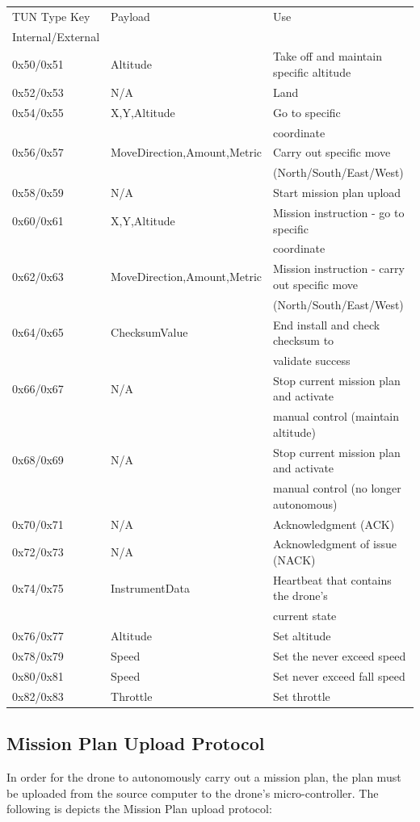 \documentclass[12pt,a4paper]{article}
\begin{document}
	\begin{tabular}{l | l | l}
	TUN Type Key & Payload & Use \\
	Internal/External &  & \\
	\hline
	0x50/0x51 & Altitude & Take off and maintain specific altitude \\
	0x52/0x53 & N/A & Land \\ 
	0x54/0x55 & X,Y,Altitude & Go to specific\\
	& & coordinate \\
	0x56/0x57 & MoveDirection,Amount,Metric & Carry out specific move\\  		& & (North/South/East/West) \\
	0x58/0x59 & N/A & Start mission plan upload \\
	0x60/0x61 & X,Y,Altitude & Mission instruction - go to specific\\ & & coordinate \\
	0x62/0x63 & MoveDirection,Amount,Metric & Mission instruction - carry out specific move\\
	& & (North/South/East/West) \\
	0x64/0x65 & ChecksumValue & End install and check checksum to\\ 	& & validate success \\
	0x66/0x67 & N/A & Stop current mission plan and activate\\
	& & manual control (maintain altitude) \\
	0x68/0x69 & N/A & Stop current mission plan and activate\\
	& & manual control (no longer autonomous) \\
	0x70/0x71 & N/A & Acknowledgment (ACK)\\
	0x72/0x73 & N/A & Acknowledgment of issue (NACK) \\
	0x74/0x75 & InstrumentData & Heartbeat that contains the drone's\\ & & current state \\ 
	0x76/0x77 & Altitude & Set altitude \\
	0x78/0x79 & Speed & Set the never exceed speed \\ 
	0x80/0x81 & Speed & Set never exceed fall speed \\
	0x82/0x83 & Throttle & Set throttle
	
	\end{tabular}
	
	\subsection{Mission Plan Upload Protocol}
	In order for the drone to autonomously carry out a mission plan, the plan must be uploaded from the source computer to the drone's micro-controller. The following is depicts the Mission Plan upload protocol:
	
\end{document}
